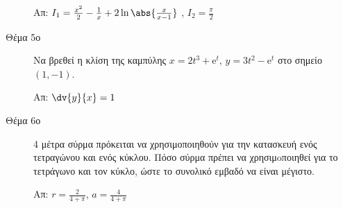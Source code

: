 \begin{description}
    \hfill Απ: $ I_{1} = \frac{x^{2}}{2} - 
    \frac{1}{x} + 2 \ln{\abs{\frac{x}{x-1} }} $ , $ I_{2}= \frac{\pi}{2} $  

  \item [Θέμα 5ο] 
Να βρεθεί η κλίση της καμπύλης $ x=2t^{3}+ \mathrm{e}^{t} $, $ y=3t^{2}-
\mathrm{e}^{t} $ στο σημείο $(1,-1)$.

\hfill Απ: $ \dv{y}{x} = 1 $  

\item [Θέμα 6ο] 
  4 μέτρα σύρμα πρόκειται να χρησιμοποιηθούν για την κατασκευή ενός τετραγώνου και ενός 
  κύκλου.  Πόσο σύρμα πρέπει να χρησιμoποιηθεί για το τετράγωνο και τον κύκλο, ώστε το 
  συνολικό εμβαδό να είναι μέγιστο.

  \hfill Απ: $ r = \frac{2}{4+ \pi} $, $ a = \frac{4}{4+ \pi} $  
      

\end{description}



